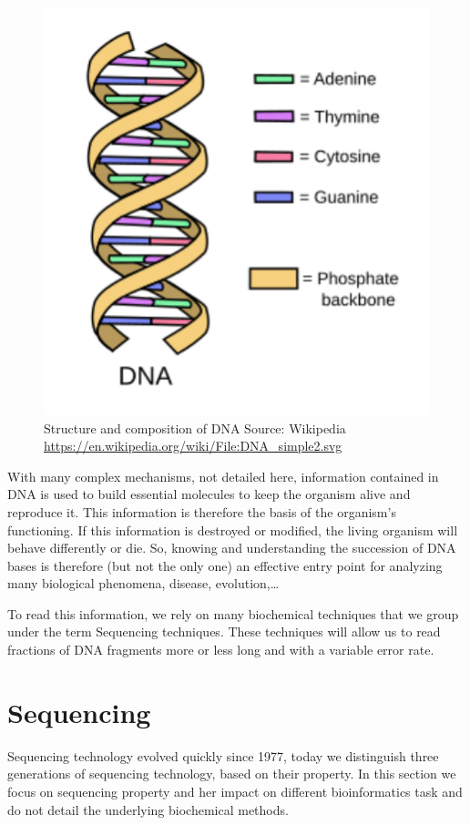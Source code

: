 \documentclass[./main.tex]{subfiles}
\begin{document}
\begin{figure}[ht]
    \centering
    \includegraphics[]{introduction/images/DNA.pdf}
    \caption{Structure and composition of DNA Source: Wikipedia \protect\url{https://en.wikipedia.org/wiki/File:DNA_simple2.svg}}
    \label{intro:fig:dna_rna_pres}
\end{figure}

With many complex mechanisms, not detailed here, information contained in DNA is used to build essential molecules to keep the organism alive and reproduce it.%
This information is therefore the basis of the organism's functioning. If this information is destroyed or modified, the living organism will behave differently or die. So, knowing and understanding the succession of DNA bases is therefore (but not the only one) an effective entry point for analyzing many biological phenomena, disease, evolution,…

To read this information, we rely on many biochemical techniques that we group under the term Sequencing techniques. These techniques will allow us to read fractions of DNA fragments more or less long and with a variable error rate.%

\section{Sequencing} \label{section:introduction:sequencing}

Sequencing technology evolved quickly since 1977\cite{sanger_sequencing}, today we distinguish three generations of sequencing technology, based on their property.
In this section we focus on sequencing property and her impact on different bioinformatics task and do not detail the underlying biochemical methods.%
\end{document}
